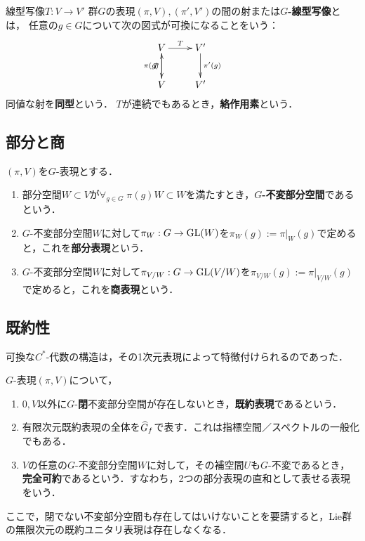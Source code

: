 \documentclass[uplatex,dvipdfmx]{jsreport}
\begin{document}
\begin{definition}
    線型写像$T:V\to V'$
    群$G$の表現$(\pi,V),(\pi',V')$の間の射または\textbf{$G$-線型写像}とは，
    任意の$g\in G$について次の図式が可換になることをいう：
    \[\xymatrix{
        V\ar[r]^-T\ar[d]_-{\pi(g)}&V'\ar[d]^-{\pi'(g)}\\
        V\ar[u]^-T&V'
    }\]
    同値な射を\textbf{同型}という．
    $T$が連続でもあるとき，\textbf{絡作用素}という．
\end{definition}

\subsection{部分と商}

\begin{definition}
    $(\pi,V)$を$G$-表現とする．
    \begin{enumerate}
        \item 部分空間$W\subset V$が$\forall_{g\in G}\;\pi(g)W\subset W$を満たすとき，\textbf{$G$-不変部分空間}であるという．
        \item $G$-不変部分空間$W$に対して$\pi_W:G\to\mathrm{GL}(W)$を$\pi_W(g):=\pi|_W(g)$で定めると，これを\textbf{部分表現}という．
        \item $G$-不変部分空間$W$に対して$\pi_{V/W}:G\to\mathrm{GL}(V/W)$を$\pi_{V/W}(g):=\pi|_{V/W}(g)$で定めると，これを\textbf{商表現}という．
    \end{enumerate}
\end{definition}

\subsection{既約性}

\begin{tcolorbox}[colframe=ForestGreen, colback=ForestGreen!10!white,breakable,colbacktitle=ForestGreen!40!white,coltitle=black,fonttitle=\bfseries\sffamily,
title=]
    可換な$C^*$-代数の構造は，その1次元表現によって特徴付けられるのであった．
\end{tcolorbox}

\begin{definition}
    $G$-表現$(\pi,V)$について，
    \begin{enumerate}
        \item $0,V$以外に$G$-\textbf{閉}不変部分空間が存在しないとき，\textbf{既約表現}であるという．
        \item 有限次元既約表現の全体を$\widehat{G}_f$で表す．これは指標空間／スペクトルの一般化でもある．
        \item $V$の任意の$G$-不変部分空間$W$に対して，その補空間$U$も$G$-不変であるとき，\textbf{完全可約}であるという．すなわち，2つの部分表現の直和として表せる表現をいう．
    \end{enumerate}
\end{definition}
\begin{remarks}
    ここで，閉でない不変部分空間も存在してはいけないことを要請すると，Lie群の無限次元の既約ユニタリ表現は存在しなくなる．
\end{remarks}
\end{document}
